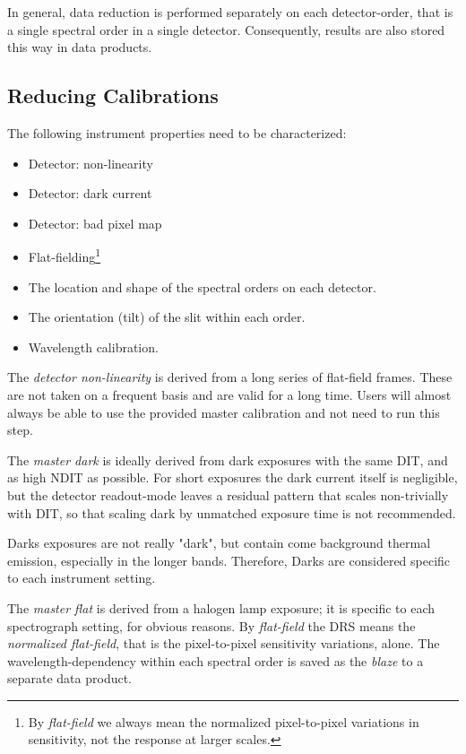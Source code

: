 In general, data reduction is performed separately on each detector-order,
that is a single spectral order in a single detector.
Consequently, results are also stored this way in data products.


\subsection{Reducing Calibrations}
\label{sec:calib:reduc}

The following instrument properties need to be characterized:
\begin{itemize}
    \item Detector: non-linearity
    \item Detector: dark current
    \item Detector: bad pixel map
    \item Flat-fielding\footnote{By \textit{flat-field} we always mean the
              normalized pixel-to-pixel variations
              in sensitivity, not the response at larger scales.}
    \item The location and shape of the spectral orders on each detector.
    \item The orientation (tilt) of the slit within each order.
    \item Wavelength calibration.
\end{itemize}

The \emph{detector non-linearity} is derived from a long series of flat-field
frames. These are not taken on a frequent basis and are valid for a long time.
Users will almost always be able to use the provided master calibration and not
need to run this step.

The \emph{master dark} is ideally derived from dark exposures with the
same DIT, and as high NDIT as possible. For short exposures the dark current
itself is negligible, but the detector readout-mode leaves a residual pattern
that scales non-trivially with DIT, so that scaling dark by unmatched exposure
time is not recommended.

Darks exposures are not really "dark", but contain come background thermal emission,
especially in the longer bands. Therefore, Darks are considered specific to
each instrument setting.

The \emph{master flat} is derived from a halogen lamp exposure; it is specific
to each spectrograph setting, for obvious reasons. By \emph{flat-field} the DRS
means the \emph{normalized flat-field}, that is the pixel-to-pixel sensitivity
variations, alone. The wavelength-dependency within each spectral order is
saved as the \emph{blaze} to a separate data product.

